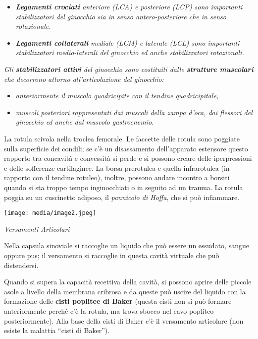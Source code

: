 \documentclass[]{article}
\begin{document}
\begin{itemize}
\item
  \emph{\textbf{Legamenti crociati} anteriore (LCA) e posteriore (LCP)
  sono importanti stabilizzatori del ginocchio sia in senso
  antero-posteriore che in senso rotazionale.}
\item
  \emph{\textbf{Legamenti collaterali} mediale (LCM) e laterale (LCL)
  sono importanti stabilizzatori medio-laterali del ginocchio ed anche
  stabilizzatori rotazionali.}
\end{itemize}

\emph{Gli \textbf{stabilizzatori attivi} del ginocchio sono costituiti
dalle \textbf{strutture muscolari} che decorrono attorno
all'articolazione del ginocchio:}

\begin{itemize}
\item
  \emph{anteriormente il muscolo quadricipite con il tendine
  quadricipitale,}
\item
  \emph{muscoli posteriori rappresentati dai muscoli della zampa d'oca,
  dai flessori del ginocchio ed anche dal muscolo gastrocnemio.}
\end{itemize}

La rotula scivola nella troclea femorale. Le faccette delle rotula sono
poggiate sulla superficie dei condili; se c'è un disassamento
dell'apparato estensore questo rapporto tra concavità e convessità si
perde e si possono creare delle iperpressioni e delle sofferenze
cartilaginee. La borsa prerotulea e quella infrarotulea (in rapporto con
il tendine rotuleo), inoltre, possono andare incontro a borsiti quando
si sta troppo tempo inginocchiati o in seguito ad un trauma. La rotula
poggia su un cuscinetto adiposo, il \emph{pannicolo di Hoffa}, che si
può infiammare.

\texttt{[image: media/image2.jpeg]}

\emph{Versamenti Articolari}

Nella capsula sinoviale si raccoglie un liquido che può essere un
essudato, sangue oppure pus; il versamento si raccoglie in questa cavità
virtuale che può distendersi.

Quando si supera la capacità recettiva della cavità, si possono aprire
delle piccole asole a livello della membrana cribrosa e da queste può
uscire del liquido con la formazione delle \textbf{cisti poplitee di
Baker} (questa cisti non si può formare anteriormente perché c'è la
rotula, ma trova sbocco nel cavo popliteo posteriormente). Alla base
della cisti di Baker c'è il versamento articolare (non esiste la
malattia ``cisti di Baker'').
\end{document}
